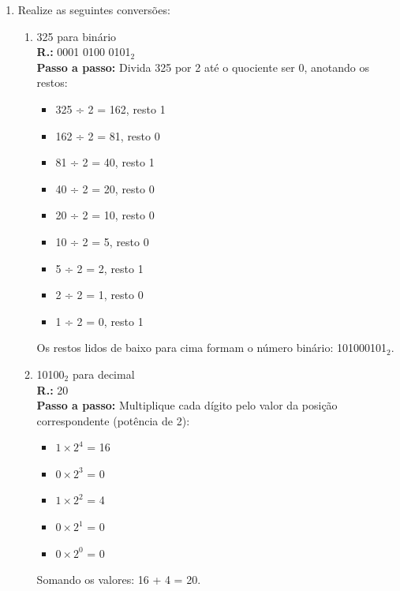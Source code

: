 \documentclass{article}[12pt]
\begin{document}
\begin{enumerate}
    \item Realize as seguintes conversões:
        \begin{enumerate}
            \item 325 para binário \\
            \textbf{R.:} 0001 0100 0101$_2$ \\
            \textbf{Passo a passo:} Divida 325 por 2 até o quociente ser 0, anotando os restos:
            \begin{itemize}
                \item 325 ÷ 2 = 162, \phantom{0}resto 1
                \item 162 ÷ 2 = \phantom{0}81, \phantom{0}resto 0
                \item \phantom{0}81 ÷ 2 = \phantom{0}40, \phantom{0}resto 1
                \item \phantom{0}40 ÷ 2 = \phantom{0}20, \phantom{0}resto 0
                \item \phantom{0}20 ÷ 2 = \phantom{0}10, \phantom{0}resto 0
                \item \phantom{0}10 ÷ 2 = \phantom{00}5, \phantom{0}resto 0
                \item \phantom{00}5 ÷ 2 = \phantom{00}2, \phantom{0}resto 1
                \item \phantom{00}2 ÷ 2 = \phantom{00}1, \phantom{0}resto 0
                \item \phantom{00}1 ÷ 2 = \phantom{00}0, \phantom{0}resto 1
            \end{itemize}
            Os restos lidos de baixo para cima formam o número binário: 101000101$_2$.

            \item 10100$_2$ para decimal \\
            \textbf{R.:} 20 \\
            \textbf{Passo a passo:} Multiplique cada dígito pelo valor da posição correspondente (potência de 2):
            \begin{itemize}
                \item $1 \times 2^4$ = \phantom{0}16
                \item $0 \times 2^3$ = \phantom{00}0
                \item $1 \times 2^2$ = \phantom{00}4
                \item $0 \times 2^1$ = \phantom{00}0
                \item $0 \times 2^0$ = \phantom{00}0
            \end{itemize}
            Somando os valores: 16 + 4 = 20.


\end{enumerate}
\end{enumerate}
\end{document}
